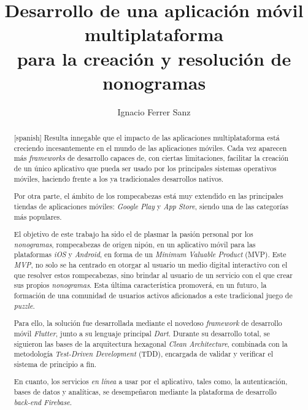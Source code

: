 \documentclass[11pt,spanish,listoffigures,listoftables]{tfgetsinf}
\title{Desarrollo de una aplicación móvil multiplataforma \\
para la creación y resolución de nonogramas}
\author{Ignacio Ferrer Sanz}
\begin{document}

\begin{abstract}[spanish]
    Resulta innegable que el impacto de las aplicaciones multiplataforma está creciendo incesantemente
    en el mundo de las aplicaciones móviles.
    Cada vez aparecen más \textit{frameworks} de desarrollo capaces de, con ciertas limitaciones,
    facilitar la creación de un único aplicativo que pueda ser usado por los principales sistemas operativos móviles, haciendo frente a
    los ya tradicionales desarrollos nativos.

    Por otra parte, el ámbito de los rompecabezas está muy extendido en las principales
    tiendas de aplicaciones móviles: \textit{Google Play} y \textit{App Store}, siendo una
    de las categorías más populares.

    El objetivo de este trabajo ha sido el de plasmar la pasión personal por los \textit{nonogramas}, rompecabezas de
    origen nipón, en un aplicativo móvil para las plataformas \textit{iOS} y \textit{Android}, en forma de un
    \textit{Minimum Valuable Product} (MVP).
    Este \textit{MVP}, no solo se ha centrado en otorgar al usuario un medio digital interactivo con
    el que resolver estos rompecabezas, sino brindar al usuario de un servicio con el que crear
    sus propios \textit{nonogramas}. Esta última característica promoverá, en un futuro, la formación de una comunidad de usuarios activos aficionados
    a este tradicional juego de \textit{puzzle}.

    Para ello, la solución fue desarrollada mediante el novedoso \textit{framework} de desarrollo
    móvil \textit{Flutter}, junto a su lenguaje principal \textit{Dart}. Durante su
    desarrollo total, se siguieron las bases de la arquitectura hexagonal \textit{Clean Architecture},
    combinada con la metodología \textit{Test-Driven Development} (TDD), encargada de validar y verificar el
    sistema de principio a fin.

    En cuanto, los servicios \textit{en línea} a usar por el aplicativo, tales como, la autenticación, bases de datos y analíticas, se desempeñaron mediante la plataforma de 
    desarrollo \textit{back-end} \textit{Firebase}.
\end{abstract}
\end{document}
